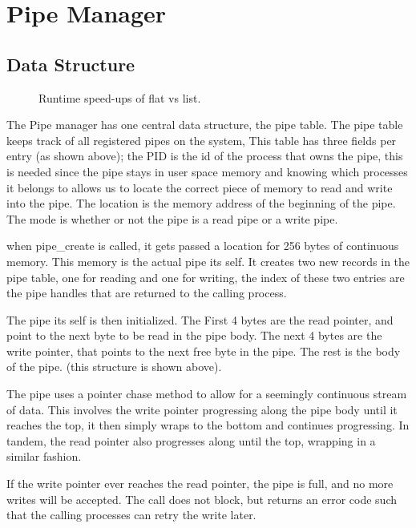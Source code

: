\documentclass[a4paper]{report}
\begin{document}
\section{Pipe Manager}

\subsection{Data Structure}

\begin{figure}[ht]
  \centering

  \def\svgwidth{\columnwidth}
  \caption{Runtime speed-ups of flat vs list.}
  \label{fig:schedulerscreen}
\end{figure}


The Pipe manager has one central data structure, the pipe table. The pipe table keeps track of all registered pipes on the system, This table has three fields per entry (as shown above); the PID is the id of the process that owns the pipe, this is needed since the pipe stays in user space memory and knowing which processes it belongs to allows us to locate the correct piece of memory to read and write into the pipe. The location is the memory address of the beginning of the pipe. The mode is whether or not the pipe is a read pipe or a write pipe.

when pipe\_create is called, it gets passed a location for 256 bytes of continuous memory. This memory is the actual pipe its self. It creates two new records in the pipe table, one for reading and one for writing, the index of these two entries are the pipe handles that are returned to the calling process. 

The pipe its self is then initialized. The First 4 bytes are the read pointer, and point to the next byte to be read in the pipe body. The next 4 bytes are the write pointer, that points to the next free byte in the pipe. The rest is the body of the pipe. (this structure is shown above). 

The pipe uses a pointer chase method to allow for a seemingly continuous stream of data. This involves the write pointer progressing along the pipe body until it reaches the top, it then simply wraps to the bottom and continues progressing. In tandem, the read pointer also progresses along until the top, wrapping in a similar fashion.

If the write pointer ever reaches the read pointer, the pipe is full, and no more writes will be accepted. The call does not block, but returns an error code such that the calling processes can retry the write later.
\end{document}
